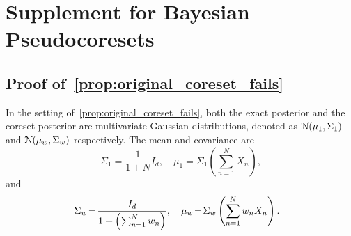 \chapter{Supplement for Bayesian Pseudocoresets}
\label{app:app1}
\renewcommand*{\MyPath}{../Appendix1}%

\section{Proof of~\cref{prop:original_coreset_fails}}
\label{app:proofs-of-failure}

In the setting of~\cref{prop:original_coreset_fails}, both the exact posterior and the coreset posterior 
are multivariate Gaussian distributions, denoted as $\mathcal{N}{\left(\mu_1, \Sigma_1\right)}$ and 
$\mathcal{N}{\left(\mu_{w}, \Sigma_{w}\right)}$ respectively. 
The mean and covariance are
\[
\Sigma_{1}=\frac{1}{1+ N} I_d, \quad \mu_{1}=\Sigma_{1}\left( \sum_{n=1}^{N} X_{n}\right), 
\label{eq:exact_post}
\]
and
\[
\label{eq:coreset_post}
\hspace{-.3cm}\Sigma_{w}\!=\!\frac{I_d}{1+ \left(\sum_{n=1}^N w_n\right)}, 
\quad
\mu_{w}\!=\!\Sigma_{w}\left( \sum_{n=1}^{N} w_n X_{n}\right).
\]

